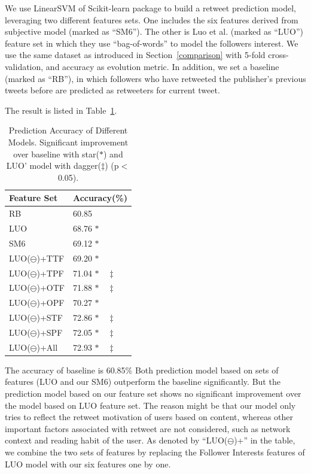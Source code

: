 \documentclass{acm_proc_article-sp}
\begin{document}
We use LinearSVM of Scikit-learn package to build a retweet prediction model, leveraging two different features sets. One includes the six features derived from subjective model (marked as ``SM6''). The other is Luo et al. \cite{Luo:2013RMF}(marked as ``LUO'') feature set in which they use ``bag-of-words'' to model the followers interest.  We use the same dataset as introduced in Section~\ref{comparison} with 5-fold cross-validation, and accuracy as evolution metric.
In addition, we set a baseline (marked as ``RB''), in which followers who have retweeted the publisher's previous tweets before are predicted as retweeters for current tweet. 

The result is listed in Table~\ref{table2}.
\begin{table}
\centering
\caption{Prediction Accuracy of Different Models. Significant improvement over baseline with star($ \ast $) and LUO' model with dagger($ \ddagger $) (p$ < $0.05).}
\label{table2}
\begin{tabular}{|l|l|}
\hline
Feature Set & Accuracy(\%) \\
\hline
RB & 60.85  \\
LUO & 68.76 $ \ast  $\\
SM6 & 69.12  $ \ast $ \\
LUO($ \ominus $)+TTF & 69.20  $ \ast $ \\
LUO($ \ominus $)+TPF & 71.04  $ \ast \quad \ddagger $ \\
LUO($ \ominus $)+OTF & 71.88  $ \ast \quad \ddagger $ \\
LUO($ \ominus $)+OPF & 70.27  $ \ast $ \\
LUO($ \ominus $)+STF & 72.86  $ \ast \quad \ddagger $ \\
LUO($ \ominus $)+SPF & 72.05  $ \ast \quad \ddagger $ \\
LUO($ \ominus $)+All & 72.93  $ \ast \quad \ddagger $ \\
\hline
\end{tabular}
\end{table}
The accuracy of baseline is 60.85\% Both prediction model based on sets of features (LUO and our SM6) outperform the baseline significantly. 
But the prediction model based on our feature set shows no significant improvement over the model based on LUO feature set. The reason might be that our model only tries to reflect the retweet motivation of users based on content, whereas other important factors associated with retweet are not considered, such as network context and reading habit of the user. 
As denoted by ``LUO($ \ominus $)+'' in the table, we combine the two sets of features by replacing the Follower Interests features of LUO model with our six features one by one. 
\end{document}
